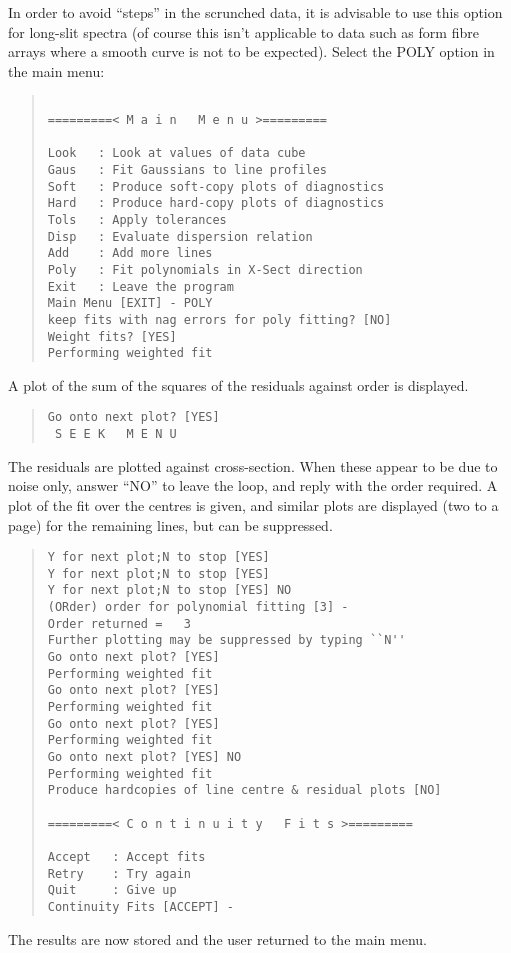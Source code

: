In order to avoid ``steps'' in the scrunched data, it is advisable to
use this option for long-slit spectra (of course this isn't applicable
to data such as form fibre arrays where a smooth curve is not to be
expected).
Select the POLY option in the main menu:
\begin{quote}\begin{verbatim}
 
=========< M a i n   M e n u >=========
 
Look   : Look at values of data cube
Gaus   : Fit Gaussians to line profiles
Soft   : Produce soft-copy plots of diagnostics
Hard   : Produce hard-copy plots of diagnostics
Tols   : Apply tolerances
Disp   : Evaluate dispersion relation
Add    : Add more lines
Poly   : Fit polynomials in X-Sect direction
Exit   : Leave the program
Main Menu [EXIT] - POLY
keep fits with nag errors for poly fitting? [NO]
Weight fits? [YES]
Performing weighted fit
\end{verbatim}\end{quote}
A plot of the sum of the squares of the residuals against order is
displayed.
\begin{quote}\begin{verbatim}
Go onto next plot? [YES]
 S E E K   M E N U
\end{verbatim}\end{quote}
The residuals are plotted against cross-section. When these appear to
be due to noise only, answer ``NO'' to leave the loop, and reply with
the order required. A plot of the fit over the centres is given, and
similar plots are displayed (two to a page) for the remaining lines,
but can be suppressed.
\begin{quote}\begin{verbatim}
Y for next plot;N to stop [YES]
Y for next plot;N to stop [YES]
Y for next plot;N to stop [YES] NO
(ORder) order for polynomial fitting [3] -
Order returned =   3
Further plotting may be suppressed by typing ``N''
Go onto next plot? [YES]
Performing weighted fit
Go onto next plot? [YES]
Performing weighted fit
Go onto next plot? [YES]
Performing weighted fit
Go onto next plot? [YES] NO
Performing weighted fit
Produce hardcopies of line centre & residual plots [NO]
 
=========< C o n t i n u i t y   F i t s >=========
 
Accept   : Accept fits
Retry    : Try again
Quit     : Give up
Continuity Fits [ACCEPT] -
\end{verbatim}\end{quote}
The results are now stored and the user returned to the main menu.

